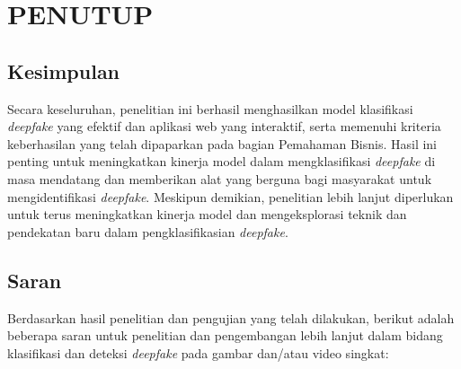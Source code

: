\chapter{PENUTUP}

\section{Kesimpulan}

Secara keseluruhan, penelitian ini berhasil menghasilkan model klasifikasi
\emph{deepfake} yang efektif dan aplikasi web yang interaktif, serta
memenuhi kriteria keberhasilan yang telah dipaparkan pada bagian Pemahaman
Bisnis. Hasil ini penting untuk meningkatkan kinerja model dalam mengklasifikasi
\emph{deepfake} di masa mendatang dan memberikan alat yang berguna
bagi masyarakat untuk mengidentifikasi \emph{deepfake}. Meskipun demikian,
penelitian lebih lanjut diperlukan untuk terus meningkatkan kinerja
model dan mengeksplorasi teknik dan pendekatan baru dalam pengklasifikasian
\emph{deepfake}.

\section{Saran}

Berdasarkan hasil penelitian dan pengujian yang telah dilakukan, berikut adalah beberapa saran untuk penelitian dan pengembangan lebih lanjut dalam bidang klasifikasi dan deteksi \emph{deepfake} pada gambar dan/atau video singkat: